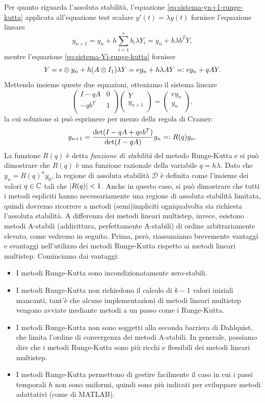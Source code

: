 Per quanto riguarda l'assoluta stabilità, l'equazione
\eqref{eq:sistema-yn+1-runge-kutta} applicata all'equazione test scalare
$y'(t) = \lambda y(t)$ fornisce l'equazione lineare
\[
y_{n+1} = y_n + h \sum_{i=1}^s b_i \lambda Y_i = y_n + h \lambda b^T Y,
\]
mentre l'equazione \eqref{eq:sistema-Yi-runge-kutta} fornisce
\[
Y = e \otimes y_n + h (A \otimes I_1) \lambda Y
= e y_n + h \lambda A Y
=\vcentcolon e y_n + q A Y.
\]
Mettendo insieme queste due equazioni, otteniamo il sistema lineare
\[
\begin{pmatrix}
I-qA   & 0 \\ 
-q b^T & 1 \\
\end{pmatrix}
\begin{pmatrix}
Y       \\
y_{n+1} \\
\end{pmatrix}
= \begin{pmatrix}
e y_n \\
y_n   \\
\end{pmatrix},
\]
la cui soluzione si può esprimere per mezzo della regola di Cramer:
\begin{equation} \label{eq:funzione-di-stabilità}
y_{n+1} = \frac{\det(I-qA+qeb^T)}{\det(I-qA)} y_n =\vcentcolon R(q) y_n.
\end{equation}
La funzione $R(q)$ è detta \emph{funzione di stabilità} del metodo Runge-Kutta
e si può dimostrare che $R(q)$ è una funzione razionale della variabile $q = h\lambda$.
Dato che $y_n = R(q)^n y_0$, la regione di assoluta stabilità $\mathcal{D}$ è definita
come l'insieme dei valori $q \in \mathbb{C}$ tali che $\left\lvert R(q)\right\rvert < 1$. Anche in questo
caso, si può dimostrare che tutti i metodi espliciti hanno necessariamente una regione
di assoluta stabilità limitata, quindi dovremo ricorrere a metodi (semi)impliciti
ogniqualvolta sia richiesta l'assoluta stabilità.
A differenza dei metodi lineari multistep, invece, esistono metodi A-stabili
(addirittura, perfettamente A-stabili) di ordine arbitrariamente elevato,
come vedremo in seguito. Prima, però, riassumiamo brevemente vantaggi e svantaggi
nell'utilizzo dei metodi Runge-Kutta rispetto ai metodi lineari multistep.
Cominciamo dai vantaggi:
\begin{itemize}
\item I metodi Runge-Kutta sono incondizionatamente zero-stabili.
\item I metodi Runge-Kutta non richiedono il calcolo di $k-1$ valori iniziali
mancanti, tant'è che alcune implementazioni di metodi lineari multistep vengono
avviate mediante metodi a un passo come i Runge-Kutta.
\item I metodi Runge-Kutta non sono soggetti alla seconda barriera di Dahlquist,
che limita l'ordine di convergenza dei metodi A-stabili. In generale, possiamo
dire che i metodi Runge-Kutta sono più ricchi e flessibili dei metodi lineari multistep.
\item I metodi Runge-Kutta permettono di gestire facilmente il caso in cui
i passi temporali $h$ non sono uniformi, quindi sono più indicati per sviluppare
metodi adattativi (come  di MATLAB).
\end{itemize}
